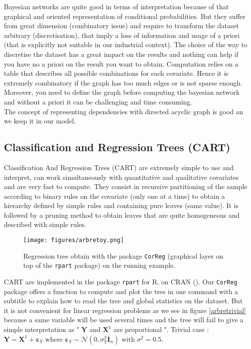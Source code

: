 \documentclass[12pt,a4paper]{report}
\begin{document}
		Bayesian networks are quite good in terms of interpretation because of that graphical and oriented representation of conditional probabilities. But they suffer from great dimension (combinatory issue) and require to transform the dataset arbitrary (discretisation), that imply a loss of information and usage of a priori (that is explicitly not suitable in our industrial context). The choice of the way to discretise the dataset has a great impact on the results and nothing can help if you have no a priori on the result you want to obtain. Computation relies on a table that describes all possible combinations for each covariate. Hence it is extremely combinatory if the graph has too much edges or is not sparse enough. Moreover, you need to define the graph before computing the bayesian network and without a priori it can be challenging and time consuming.\\
		
The concept of representing dependencies with directed acyclic graph is good an we keep it in our model.		
			
	
		
	
\subsection{Classification and Regression Trees (CART)}

	
		Classification And Regression Trees (CART) \cite{breiman1984classification} are extremely simple to use and interpret, can work simultaneously with quantitative and qualitative covariates and are very fast to compute. They consist in recursive partitioning of the sample according to binary rules on the covariate (only one at a time) to obtain a hierarchy defined by simple rules and containing pure leaves (same value). It is followed by a pruning method to obtain leaves that are quite homogeneous and described with simple rules.\\
		
		\begin{figure}
			\centering
				\texttt{[image: figures/arbretoy.png]} 
			\caption{Regression tree obtain with the package {\tt CorReg}
			 (graphical layer on top of  the {\tt rpart} package) on the running example.}\label{arbretoy}
		\end{figure}
		CART are implemented in the package {\tt rpart} 
		for R, on CRAN (\cite{packagerpart}). Our {\tt CorReg} 
		package offers a function to compute and plot the tree in one command with a subtitle to explain how to read the tree and global statistics on the dataset.
		But it is not convenient for linear regression problems as we see in figure \ref{arbretrivial} because a same variable will be used several times and the tree will fail to give a simple interpretation as " $\boldsymbol{Y}$ and $\boldsymbol{X}^1$ are proportional ". Trivial case : $\boldsymbol{Y}=\boldsymbol{X}^1 + \boldsymbol{\varepsilon}_Y$ where $\boldsymbol{\varepsilon}_Y \sim \mathcal{N}(0, \sigma^2_Y \boldsymbol{I}_n)$ with $\sigma^2=0.5$. \\
		
\end{document}
